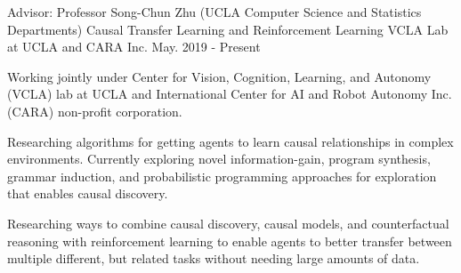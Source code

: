 
\begin{cventries}

      \cventry
        {Advisor: Professor Song-Chun Zhu (UCLA Computer Science and Statistics Departments)} %
        {Causal Transfer Learning and Reinforcement Learning} %
        {VCLA Lab at UCLA and CARA Inc.} %
        {May. 2019 - Present} %
        {
          \begin{cvitems} %
            \item {Working jointly under Center for Vision, Cognition, Learning, and Autonomy (VCLA) lab at UCLA and 
            International Center for AI and Robot Autonomy Inc. (CARA) non-profit corporation. }
            \item {Researching algorithms for getting agents to learn causal relationships in 
            complex environments. Currently exploring novel information-gain, program synthesis, 
            grammar induction, and probabilistic programming approaches for exploration that enables causal discovery.}
            \item {Researching ways to combine causal discovery, causal models, and 
            counterfactual reasoning 
            with reinforcement learning to enable agents to better 
            transfer between multiple different, but related tasks without needing large amounts of data.}
          \end{cvitems}
        }
    
\end{cventries}

